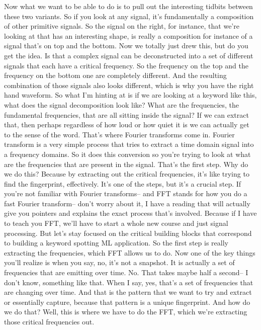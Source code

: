 Now what we want to be able to do is to pull out the interesting tidbits
between these two variants.
So if you look at any signal, it's fundamentally a composition
of other primitive signals.
So the signal on the right, for instance,
that we're looking at that has an interesting shape,
is really a composition for instance of a signal that's on top and the bottom.
Now we totally just drew this, but do you get the idea.
Is that a complex signal can be deconstructed
into a set of different signals that each have a critical frequency.
So the frequency on the top and the frequency on the bottom one
are completely different.
And the resulting combination of those signals
also looks different, which is why you have the right hand waveform.
So what I'm hinting at is if we are looking at a keyword like this,
what does the signal decomposition look like?
What are the frequencies, the fundamental frequencies,
that are all sitting inside the signal?
If we can extract that, then perhaps regardless of how loud or how quiet
it is we can actually get to the sense of the word.
That's where Fourier transforms come in.
Fourier transform is a very simple process
that tries to extract a time domain signal into a frequency domains.
So it does this conversion so you're trying
to look at what are the frequencies that are present in the signal.
That's the first step.
Why do we do this?
Because by extracting out the critical frequencies,
it's like trying to find the fingerprint, effectively.
It's one of the steps, but it's a crucial step.
If you're not familiar with Fourier transforms--
and FFT stands for how you do a fast Fourier transform--
don't worry about it, I have a reading that will actually give you pointers
and explains the exact process that's involved.
Because if I have to teach you FFT, we'll
have to start a whole new course and just signal processing.
But let's stay focused on the critical building
blocks that correspond to building a keyword spotting ML application.
So the first step is really extracting the frequencies,
which FFT allows us to do.
Now one of the key things you'll realize is when you say,
no, it's not a snapshot.
It is actually a set of frequencies that are emitting over time.
No.
That takes maybe half a second--
I don't know, something like that.
When I say, yes, that's a set of frequencies
that are changing over time.
And that is the pattern that we want to try and extract or essentially capture,
because that pattern is a unique fingerprint.
And how do we do that?
Well, this is where we have to do the FFT, which we're extracting
those critical frequencies out.
